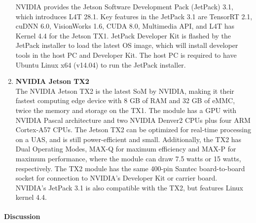 \begin{enumerate}
			NVIDIA provides the Jetson Software Development Pack (JetPack) 3.1, which introduces 
			L4T 28.1. Key features in the JetPack 3.1 are TensorRT 2.1, cuDNN 6.0, VisionWorks 1.6, 
			CUDA 8.0, Multimedia API, and L4T has Kernel 4.4 for the Jetson TX1. JetPack Developer 
			Kit is flashed by the JetPack installer to load the latest OS image, which will install 
			developer tools in the host PC and Developer Kit. The host PC is required to have 
			Ubuntu Linux x64 (v14.04) to run the JetPack installer\cite{JetPack, JetPackRel}.\\ 

		\item\textbf{NVIDIA Jetson TX2}\\
			The NVIDIA Jetson TX2 is the latest SoM by NVIDIA, making it their fastest computing edge
			device with 8 GB of RAM and 32 GB of eMMC, twice the memory and storage on the TX1. The 
			module has a GPU with NVIDIA Pascal architecture and two NVIDIA Denver2 CPUs plus four 
			ARM Cortex-A57 CPUs\cite{TX2Wiki, JetsonFAQ}. The Jetson TX2 can be optimized for 
			real-time processing on a UAS, and is 
			still power-efficient and small\cite{JetsonGenius}. Additionally, the TX2 has 
			Dual Operating Modes, MAX-Q for maximum efficiency and MAX-P for maximum performance, 
			where the module can draw 7.5 watts or 15 watts, respectively\cite{TechnoByte}. The TX2 
			module has the same 400-pin Samtec board-to-board socket for connection to NVIDIA's 
			Developer Kit or carrier board. \\

			NVIDIA's JetPack 3.1 is also compatible with the TX2, but features Linux kernel 
			4.4\cite{TX2Wiki, JetPackRel}.\\
	\end{enumerate}


\paragraph{Discussion}

